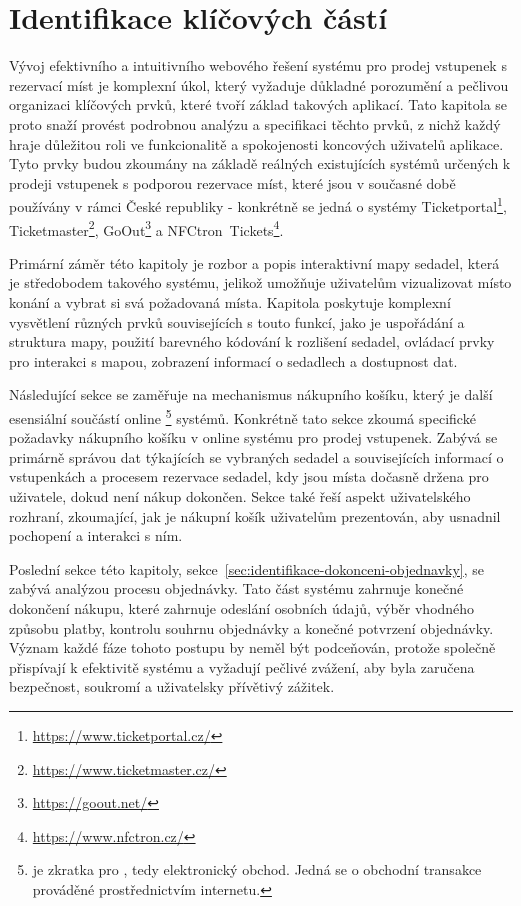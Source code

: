 \chapter{Identifikace klíčových částí}
\label{ch:identifikace}
Vývoj efektivního a intuitivního webového řešení systému pro prodej vstupenek s rezervací míst je komplexní úkol, který vyžaduje důkladné porozumění a pečlivou organizaci klíčových prvků, které tvoří základ takových aplikací.
Tato kapitola se proto snaží provést podrobnou analýzu a specifikaci těchto prvků, z nichž každý hraje důležitou roli ve funkcionalitě a spokojenosti koncových uživatelů aplikace.
Tyto prvky budou zkoumány na základě reálných existujících systémů určených k prodeji vstupenek s podporou rezervace míst, které jsou v současné době používány v rámci České republiky - konkrétně se jedná o systémy Ticketportal\footnote{\url{https://www.ticketportal.cz/}}, Ticketmaster\footnote{\url{https://www.ticketmaster.cz/}}, GoOut\footnote{\url{https://goout.net/}} a NFCtron~Tickets\footnote{\url{https://www.nfctron.cz/}}.

Primární záměr této kapitoly je rozbor a popis interaktivní mapy sedadel, která je středobodem takového systému, jelikož umožňuje uživatelům vizualizovat místo konání a vybrat si svá požadovaná místa.
Kapitola poskytuje komplexní vysvětlení různých prvků souvisejících s touto funkcí, jako je uspořádání a struktura mapy, použití barevného kódování k rozlišení sedadel, ovládací prvky pro interakci s mapou, zobrazení informací o sedadlech a dostupnost dat.

Následující sekce se zaměřuje na mechanismus nákupního košíku, který je další esensiální součástí online \footnote{ je zkratka pro , tedy elektronický obchod. Jedná se o obchodní transakce prováděné prostřednictvím internetu.} systémů.
Konkrétně tato sekce zkoumá specifické požadavky nákupního košíku v online systému pro prodej vstupenek.
Zabývá se primárně správou dat týkajících se vybraných sedadel a souvisejících informací o vstupenkách a procesem rezervace sedadel, kdy jsou místa dočasně držena pro uživatele, dokud není nákup dokončen.
Sekce také řeší aspekt uživatelského rozhraní, zkoumající, jak je nákupní košík uživatelům prezentován, aby usnadnil pochopení a interakci s ním.

Poslední sekce této kapitoly, sekce~\ref{sec:identifikace-dokonceni-objednavky}, se zabývá analýzou procesu objednávky.
Tato část systému zahrnuje konečné dokončení nákupu, které zahrnuje odeslání osobních údajů, výběr vhodného způsobu platby, kontrolu souhrnu objednávky a konečné potvrzení objednávky.
Význam každé fáze tohoto postupu by neměl být podceňován, protože společně přispívají k efektivitě systému a vyžadují pečlivé zvážení, aby byla zaručena bezpečnost, soukromí a uživatelsky přívětivý zážitek.

